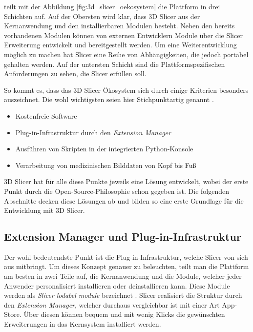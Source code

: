 \citet[S.~1326]{fedorov2012slicer} teilt mit der Abbildung
\ref{fig:3d_slicer_oekosystem} die Plattform in drei Schichten auf. Auf der Obersten
wird klar, dass 3D Slicer aus der Kernanwendung und den installierbaren Modulen
besteht. Neben den bereits vorhandenen Modulen können von externen Entwicklern Module
über die Slicer Erweiterung entwickelt und bereitgestellt werden. Um eine
Weiterentwicklung möglich zu machen hat Slicer eine Reihe von Abhängigkeiten, die
jedoch portabel gehalten werden. Auf der untersten Schicht sind die
Plattformspezifischen Anforderungen zu sehen, die Slicer erfüllen soll.

So kommt es, dass das 3D Slicer Ökosystem sich durch einige Kriterien besonders
auszeichnet. Die wohl wichtigsten seien hier Stichpunktartig genannt \citep[]{slicer2024}.

\begin{itemize}
	\item Kostenfreie Software

	\item Plug-in-Infrastruktur durch den \textit{Extension Manager}

	\item Ausführen von Skripten in der integrierten Python-Konsole

	\item Verarbeitung von medizinischen Bilddaten von Kopf bis Fuß
\end{itemize}

3D Slicer hat für alle diese Punkte jeweils eine Lösung entwickelt, wobei der
erste Punkt durch die Open-Source-Philosophie schon gegeben ist. Die folgenden Abschnitte
decken diese Lösungen ab und bilden so eine erste Grundlage für die Entwicklung mit
3D Slicer.

\subsection{Extension Manager und Plug-in-Infrastruktur}
Der wohl bedeutendste Punkt ist die Plug-in-Infrastruktur, welche Slicer von
sich aus mitbringt. Um dieses Konzept genauer zu beleuchten, teilt man die
Plattform am besten in zwei Teile auf, die Kernanwendung und die Module, welcher
jeder Anwender personalisiert installieren oder deinstallieren kann. Diese Module
werden als \textit{Slicer lodabel module} bezeichnet \citep[vgl.][S.~1332]{fedorov2012slicer}.
Slicer realisiert die Struktur durch den \textit{Extension Manager}, welcher
durchaus vergleichbar ist mit einer Art App-Store. Über diesen können bequem und
mit wenig Klicks die gewünschten Erweiterungen in das Kernsystem installiert werden.

